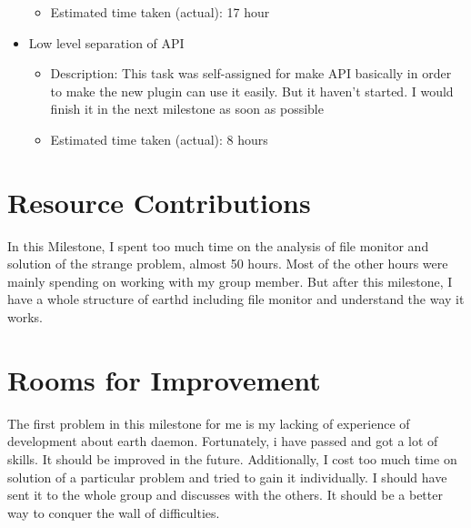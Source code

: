 \begin{itemize}
\begin{itemize}
	         \item Estimated time taken (actual): 17 hour
	     \end{itemize}
	\item Low level separation of API
	     \begin{itemize}
	         \item Description: This task was self-assigned for make API basically in order to make the new plugin can use it easily. But it haven't started. I would finish it in the next milestone as soon as possible
	         \item Estimated time taken (actual): 8 hours
	     \end{itemize}
\end{itemize}

\section*{Resource Contributions}

In this Milestone, I spent too much time on the analysis of file monitor and solution of the strange problem, almost 50 hours. Most of the other hours were mainly spending on working with my group member. But after this milestone, I have a whole structure of earthd including file monitor and understand the way it works.

\section*{Rooms for Improvement}


The first problem in this milestone for me is my lacking of experience of development about earth daemon. Fortunately, i have passed and got a lot of skills. It should be improved in the future. Additionally, I cost too much time on solution of a particular problem and tried to gain it individually. I should have sent it to the whole group and discusses with the others. It should be a better way to conquer the wall of difficulties.
